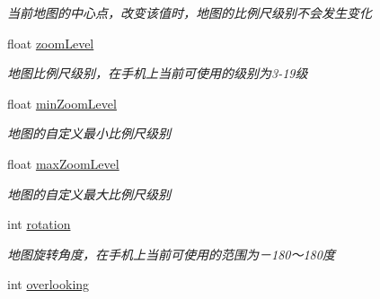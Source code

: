 \begin{DoxyCompactItemize}
\begin{DoxyCompactList}\small\item\em 当前地图的中心点，改变该值时，地图的比例尺级别不会发生变化 \end{DoxyCompactList}\item 
\hypertarget{interface_b_m_k_map_view_a5e6c1e21fddd4d6a24194be53f14c27e}{}float \hyperlink{interface_b_m_k_map_view_a5e6c1e21fddd4d6a24194be53f14c27e}{zoom\+Level}\label{interface_b_m_k_map_view_a5e6c1e21fddd4d6a24194be53f14c27e}

\begin{DoxyCompactList}\small\item\em 地图比例尺级别，在手机上当前可使用的级别为3-\/19级 \end{DoxyCompactList}\item 
\hypertarget{interface_b_m_k_map_view_ab504b39a0a908c811a258e058be7eeb9}{}float \hyperlink{interface_b_m_k_map_view_ab504b39a0a908c811a258e058be7eeb9}{min\+Zoom\+Level}\label{interface_b_m_k_map_view_ab504b39a0a908c811a258e058be7eeb9}

\begin{DoxyCompactList}\small\item\em 地图的自定义最小比例尺级别 \end{DoxyCompactList}\item 
\hypertarget{interface_b_m_k_map_view_ae9fce90bc3332cdf0dc477c3959e5e79}{}float \hyperlink{interface_b_m_k_map_view_ae9fce90bc3332cdf0dc477c3959e5e79}{max\+Zoom\+Level}\label{interface_b_m_k_map_view_ae9fce90bc3332cdf0dc477c3959e5e79}

\begin{DoxyCompactList}\small\item\em 地图的自定义最大比例尺级别 \end{DoxyCompactList}\item 
\hypertarget{interface_b_m_k_map_view_a344d3d4be5d00adfc22feaa2ab6869c4}{}int \hyperlink{interface_b_m_k_map_view_a344d3d4be5d00adfc22feaa2ab6869c4}{rotation}\label{interface_b_m_k_map_view_a344d3d4be5d00adfc22feaa2ab6869c4}

\begin{DoxyCompactList}\small\item\em 地图旋转角度，在手机上当前可使用的范围为－180～180度 \end{DoxyCompactList}\item 
\hypertarget{interface_b_m_k_map_view_a8ae6f6cf221ea4f14923150d8974f997}{}int \hyperlink{interface_b_m_k_map_view_a8ae6f6cf221ea4f14923150d8974f997}{overlooking}\label{interface_b_m_k_map_view_a8ae6f6cf221ea4f14923150d8974f997}


\end{DoxyCompactItemize}
